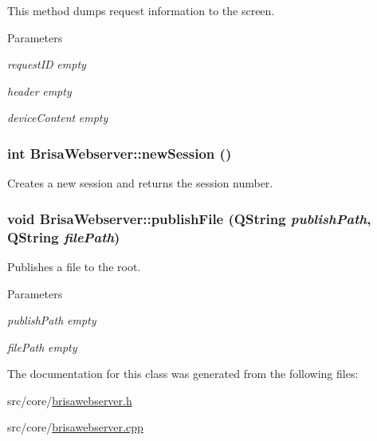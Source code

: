 This method dumps request information to the screen. 
\begin{DoxyParams}{Parameters}
\item[{\em requestID}]{\itshape empty\/} \item[{\em header}]{\itshape empty\/} \item[{\em deviceContent}]{\itshape empty\/} \end{DoxyParams}
\hypertarget{classBrisaCore_1_1BrisaWebserver_aabf7fff7c7e876c2f7b98678d8cbcaf3}{
\subsubsection[{newSession}]{\setlength{\rightskip}{0pt plus 5cm}int BrisaWebserver::newSession ()}}
\label{classBrisaCore_1_1BrisaWebserver_aabf7fff7c7e876c2f7b98678d8cbcaf3}


Creates a new session and returns the session number. \hypertarget{classBrisaCore_1_1BrisaWebserver_aaf83aae563ea7640d79a3d216b0ac93a}{
\subsubsection[{publishFile}]{\setlength{\rightskip}{0pt plus 5cm}void BrisaWebserver::publishFile (QString {\em publishPath}, \/  QString {\em filePath})}}
\label{classBrisaCore_1_1BrisaWebserver_aaf83aae563ea7640d79a3d216b0ac93a}


Publishes a file to the root. 
\begin{DoxyParams}{Parameters}
\item[{\em publishPath}]{\itshape empty\/} \item[{\em filePath}]{\itshape empty\/} \end{DoxyParams}


The documentation for this class was generated from the following files:\begin{DoxyCompactItemize}
\item 
src/core/\hyperlink{brisawebserver_8h}{brisawebserver.h}\item 
src/core/\hyperlink{brisawebserver_8cpp}{brisawebserver.cpp}\end{DoxyCompactItemize}

